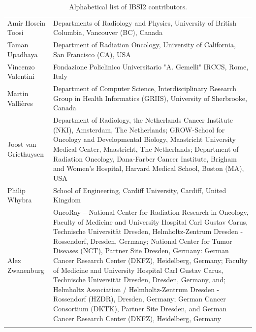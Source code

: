\documentclass[fleqn,a4paper,oneside,openany]{book}
\begin{document}
\begin{longtable}{p{4cm}p{10cm}}
Amir Hosein Toosi & Departments of Radiology and Physics, University of British Columbia, Vancouver (BC), Canada\\
Taman Upadhaya
& Department of Radiation Oncology, University of California, San Francisco (CA), USA\\ 
Vincenzo Valentini
& Fondazione Policlinico Universitario "A. Gemelli" IRCCS, Rome, Italy\\ 
Martin Valli{\`e}res
& Department of Computer Science, Interdisciplinary Research Group in Health Informatics (GRIIS), University of Sherbrooke, Canada\\
Joost van Griethuysen
& Department of Radiology, the Netherlands Cancer Institute (NKI), Amsterdam, The Netherlands; GROW-School for Oncology and Developmental Biology, Maastricht University Medical Center, Maastricht, The Netherlands; Department of Radiation Oncology, Dana-Farber Cancer Institute, Brigham and Women’s Hospital, Harvard Medical School, Boston (MA), USA\\ 
Philip Whybra
& School of Engineering, Cardiff University, Cardiff, United Kingdom\\ 
Alex Zwanenburg
& OncoRay – National Center for Radiation Research in Oncology, Faculty of Medicine and University Hospital Carl Gustav Carus, Technische Universität Dresden, Helmholtz-Zentrum Dresden - Rossendorf, Dresden, Germany; National Center for Tumor Diseases (NCT), Partner Site Dresden, Germany: German Cancer Research Center (DKFZ), Heidelberg, Germany; Faculty of Medicine and University Hospital Carl Gustav Carus, Technische Universität Dresden, Dresden, Germany, and; Helmholtz Association / Helmholtz-Zentrum Dresden - Rossendorf (HZDR), Dresden, Germany; German Cancer Consortium (DKTK), Partner Site Dresden, and German Cancer Research Center (DKFZ), Heidelberg, Germany\\ 
 
\bottomrule
\caption{Alphabetical list of IBSI2 contributors.\label{participantList}}
\end{longtable}
\newpage
\setcounter{tocdepth}{1}
\tableofcontents

\mainmatter
\end{document}
